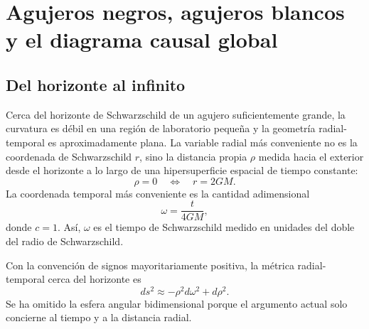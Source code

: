 \chapter{Agujeros negros, agujeros blancos y el diagrama causal global}


\section{Del horizonte al infinito}

Cerca del horizonte de Schwarzschild de un agujero suficientemente grande, la curvatura es débil en una región de laboratorio pequeña y la geometría radial-temporal es aproximadamente plana. La variable radial más conveniente no es la coordenada de Schwarzschild \(r\), sino la distancia propia \(\rho\) medida hacia el exterior desde el horizonte a lo largo de una hipersuperficie espacial de tiempo constante:
\begin{equation}
\rho=0 \quad\Longleftrightarrow\quad r=2GM .
\label{eq:l04-rho-horizon}
\end{equation}
La coordenada temporal más conveniente es la cantidad adimensional
\begin{equation}
\omega=\frac{t}{4GM},
\label{eq:l04-omega}
\end{equation}
donde \(c=1\). Así, \(\omega\) es el tiempo de Schwarzschild medido en unidades del doble del radio de Schwarzschild.

Con la convención de signos mayoritariamente positiva, la métrica radial-temporal cerca del horizonte es
\begin{equation}
ds^2\approx-\rho^2d\omega^2+d\rho^2.
\label{eq:l04-rindler}
\end{equation}
Se ha omitido la esfera angular bidimensional porque el argumento actual solo concierne al tiempo y a la distancia radial.

